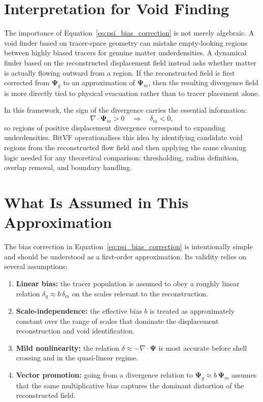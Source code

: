 \documentclass[12pt]{report}
\begin{document}
\section{Interpretation for Void Finding}

The importance of Equation~\ref{eq:psi_bias_correction} is not merely algebraic. A void finder based on tracer-space geometry can mistake empty-looking regions between highly biased tracers for genuine matter underdensities. A dynamical finder based on the reconstructed displacement field instead asks whether matter is actually flowing outward from a region. If the reconstructed field is first corrected from $\boldsymbol{\Psi}_g$ to an approximation of $\boldsymbol{\Psi}_m$, then the resulting divergence field is more directly tied to physical evacuation rather than to tracer placement alone.

In this framework, the sign of the divergence carries the essential information:
\begin{equation}
    \nabla \cdot \boldsymbol{\Psi}_m > 0
    \quad \Longrightarrow \quad
    \delta_m < 0,
\end{equation}
so regions of positive displacement divergence correspond to expanding underdensities. BitVF operationalises this idea by identifying candidate void regions from the reconstructed flow field and then applying the same cleaning logic needed for any theoretical comparison: thresholding, radius definition, overlap removal, and boundary handling.

\section{What Is Assumed in This Approximation}

The bias correction in Equation~\ref{eq:psi_bias_correction} is intentionally simple and should be understood as a first-order approximation. Its validity relies on several assumptions:
\begin{enumerate}
    \item \textbf{Linear bias:} the tracer population is assumed to obey a roughly linear relation $\delta_g \approx b\,\delta_m$ on the scales relevant to the reconstruction.
    \item \textbf{Scale-independence:} the effective bias $b$ is treated as approximately constant over the range of scales that dominate the displacement reconstruction and void identification.
    \item \textbf{Mild nonlinearity:} the relation $\delta \approx -\nabla\cdot\boldsymbol{\Psi}$ is most accurate before shell crossing and in the quasi-linear regime.
    \item \textbf{Vector promotion:} going from a divergence relation to $\boldsymbol{\Psi}_g \approx b\,\boldsymbol{\Psi}_m$ assumes that the same multiplicative bias captures the dominant distortion of the reconstructed field.
\end{enumerate}
\end{document}
